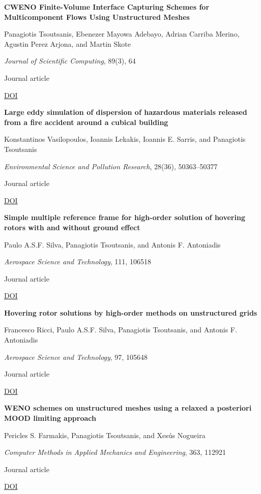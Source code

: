 \documentclass[11pt,a4paper]{article}
\newlength{\cventrysep}
\newenvironment{cventry}{%
  \par\noindent\begin{minipage}{\linewidth}
  \RaggedRight\fontsize{9.8}{12.5}\selectfont
}{\end{minipage}\par\addvspace{\cventrysep}}
\newcommand{\cvtitle}[1]{{\bfseries #1\par}\vspace{1pt}}
\newcommand{\cvdetail}[1]{{#1\par}\vspace{1pt}}
\newcommand{\cvmeta}[1]{{\fontsize{9}{11.5}\selectfont\color{Muted}#1\par}\vspace{1pt}}
\newcommand{\cvlinks}[1]{{\fontsize{9}{11.5}\selectfont #1\par}}
\newcommand{\cvyear}[1]{{\color{Teal}\bfseries\fontsize{11}{13}\selectfont #1\par}\vspace{6pt}}
\begin{document}
\begin{cventry}
\cvtitle{CWENO Finite-Volume Interface Capturing Schemes for Multicomponent Flows Using Unstructured Meshes}
\cvdetail{Panagiotis Tsoutsanis, Ebenezer Mayowa Adebayo, Adrian Carriba Merino, Agustin Perez Arjona, and Martin Skote}
\cvmeta{\textit{Journal of Scientific Computing}, 89(3), 64\par Journal article}
\cvlinks{\href{https://doi.org/10.1007/s10915-021-01673-y}{DOI}}
\end{cventry}

\begin{cventry}
\cvtitle{Large eddy simulation of dispersion of hazardous materials released from a fire accident around a cubical building}
\cvdetail{Konstantinos Vasilopoulos, Ioannis Lekakis, Ioannis E. Sarris, and Panagiotis Tsoutsanis}
\cvmeta{\textit{Environmental Science and Pollution Research}, 28(36), 50363--50377\par Journal article}
\cvlinks{\href{https://doi.org/10.1007/s11356-021-13604-3}{DOI}}
\end{cventry}

\begin{cventry}
\cvtitle{Simple multiple reference frame for high-order solution of hovering rotors with and without ground effect}
\cvdetail{Paulo A.S.F. Silva, Panagiotis Tsoutsanis, and Antonis F. Antoniadis}
\cvmeta{\textit{Aerospace Science and Technology}, 111, 106518\par Journal article}
\cvlinks{\href{https://doi.org/10.1016/j.ast.2021.106518}{DOI}}
\end{cventry}

\begin{cventry}
\cvyear{2020}
\cvtitle{Hovering rotor solutions by high-order methods on unstructured grids}
\cvdetail{Francesco Ricci, Paulo A.S.F. Silva, Panagiotis Tsoutsanis, and Antonis F. Antoniadis}
\cvmeta{\textit{Aerospace Science and Technology}, 97, 105648\par Journal article}
\cvlinks{\href{https://doi.org/10.1016/j.ast.2019.105648}{DOI}}
\end{cventry}

\begin{cventry}
\cvtitle{WENO schemes on unstructured meshes using a relaxed a posteriori MOOD limiting approach}
\cvdetail{Pericles S. Farmakis, Panagiotis Tsoutsanis, and Xesús Nogueira}
\cvmeta{\textit{Computer Methods in Applied Mechanics and Engineering}, 363, 112921\par Journal article}
\cvlinks{\href{https://doi.org/10.1016/j.cma.2020.112921}{DOI}}
\end{cventry}
\end{document}
